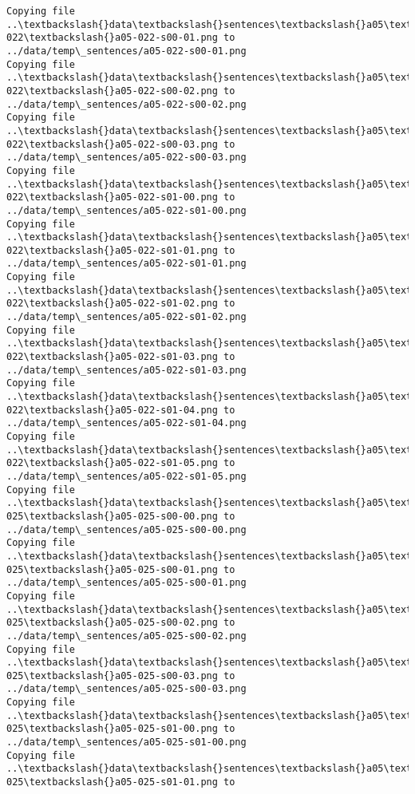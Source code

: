 \documentclass[11pt]{article}
\begin{document}
\begin{Verbatim}[commandchars=\\\{\}]
Copying file ..\textbackslash{}data\textbackslash{}sentences\textbackslash{}a05\textbackslash{}a05-022\textbackslash{}a05-022-s00-01.png to
../data/temp\_sentences/a05-022-s00-01.png
Copying file ..\textbackslash{}data\textbackslash{}sentences\textbackslash{}a05\textbackslash{}a05-022\textbackslash{}a05-022-s00-02.png to
../data/temp\_sentences/a05-022-s00-02.png
Copying file ..\textbackslash{}data\textbackslash{}sentences\textbackslash{}a05\textbackslash{}a05-022\textbackslash{}a05-022-s00-03.png to
../data/temp\_sentences/a05-022-s00-03.png
Copying file ..\textbackslash{}data\textbackslash{}sentences\textbackslash{}a05\textbackslash{}a05-022\textbackslash{}a05-022-s01-00.png to
../data/temp\_sentences/a05-022-s01-00.png
Copying file ..\textbackslash{}data\textbackslash{}sentences\textbackslash{}a05\textbackslash{}a05-022\textbackslash{}a05-022-s01-01.png to
../data/temp\_sentences/a05-022-s01-01.png
Copying file ..\textbackslash{}data\textbackslash{}sentences\textbackslash{}a05\textbackslash{}a05-022\textbackslash{}a05-022-s01-02.png to
../data/temp\_sentences/a05-022-s01-02.png
Copying file ..\textbackslash{}data\textbackslash{}sentences\textbackslash{}a05\textbackslash{}a05-022\textbackslash{}a05-022-s01-03.png to
../data/temp\_sentences/a05-022-s01-03.png
Copying file ..\textbackslash{}data\textbackslash{}sentences\textbackslash{}a05\textbackslash{}a05-022\textbackslash{}a05-022-s01-04.png to
../data/temp\_sentences/a05-022-s01-04.png
Copying file ..\textbackslash{}data\textbackslash{}sentences\textbackslash{}a05\textbackslash{}a05-022\textbackslash{}a05-022-s01-05.png to
../data/temp\_sentences/a05-022-s01-05.png
Copying file ..\textbackslash{}data\textbackslash{}sentences\textbackslash{}a05\textbackslash{}a05-025\textbackslash{}a05-025-s00-00.png to
../data/temp\_sentences/a05-025-s00-00.png
Copying file ..\textbackslash{}data\textbackslash{}sentences\textbackslash{}a05\textbackslash{}a05-025\textbackslash{}a05-025-s00-01.png to
../data/temp\_sentences/a05-025-s00-01.png
Copying file ..\textbackslash{}data\textbackslash{}sentences\textbackslash{}a05\textbackslash{}a05-025\textbackslash{}a05-025-s00-02.png to
../data/temp\_sentences/a05-025-s00-02.png
Copying file ..\textbackslash{}data\textbackslash{}sentences\textbackslash{}a05\textbackslash{}a05-025\textbackslash{}a05-025-s00-03.png to
../data/temp\_sentences/a05-025-s00-03.png
Copying file ..\textbackslash{}data\textbackslash{}sentences\textbackslash{}a05\textbackslash{}a05-025\textbackslash{}a05-025-s01-00.png to
../data/temp\_sentences/a05-025-s01-00.png
Copying file ..\textbackslash{}data\textbackslash{}sentences\textbackslash{}a05\textbackslash{}a05-025\textbackslash{}a05-025-s01-01.png to

\end{Verbatim}
\end{document}
